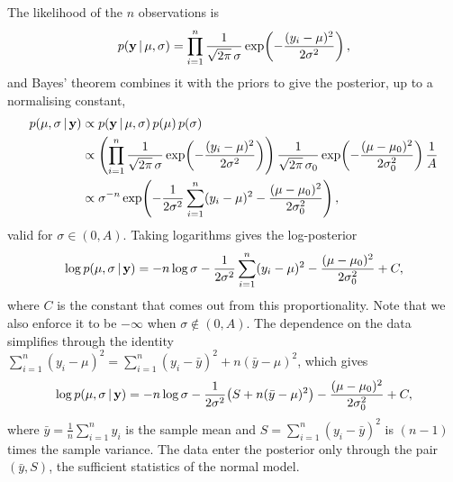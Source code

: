 The likelihood of the $n$ observations is
%
\begin{equation}
  p(\mathbf{y} \,|\, \mu, \sigma)
  = \prod_{i=1}^{n} \frac{1}{\sqrt{2\pi}\,\sigma}
    \exp\!\left(-\frac{(y_i - \mu)^2}{2\sigma^2}\right),
\end{equation}
%
and Bayes' theorem combines it with the priors to give the posterior,
up to a normalising constant,
%
\begin{equation}
\begin{aligned}
  p(\mu, \sigma \,|\, \mathbf{y})
  &\propto p(\mathbf{y} \,|\, \mu, \sigma)\,p(\mu)\,p(\sigma) \\
  &\propto \left(\prod_{i=1}^{n} \frac{1}{\sqrt{2\pi}\,\sigma}
     \exp\!\left(-\frac{(y_i-\mu)^2}{2\sigma^2}\right)\right)
     \frac{1}{\sqrt{2\pi}\,\sigma_0}
     \exp\!\left(-\frac{(\mu-\mu_0)^2}{2\sigma_0^2}\right)
     \frac{1}{A} \\
  &\propto \sigma^{-n}
     \exp\!\left(-\frac{1}{2\sigma^2}\sum_{i=1}^{n}(y_i-\mu)^2
     - \frac{(\mu-\mu_0)^2}{2\sigma_0^2}\right),
\end{aligned}
\end{equation}
%
valid for $\sigma \in (0, A)$. Taking logarithms gives the
log-posterior
%
\begin{equation}
  \log p(\mu, \sigma \,|\, \mathbf{y})
  = -n\log\sigma
    - \frac{1}{2\sigma^2}\sum_{i=1}^{n}(y_i - \mu)^2
    - \frac{(\mu - \mu_0)^2}{2\sigma_0^2}
    + C,
\end{equation}
%
where $C$ is the constant that comes out from this proportionality. Note that we also enforce it to be $-\infty$ when $\sigma \notin (0, A)$. The dependence on the
data simplifies through the identity
$\sum_{i=1}^{n}(y_i - \mu)^2 = \sum_{i=1}^{n}(y_i - \bar{y})^2
+ n(\bar{y} - \mu)^2$, which gives
%
\begin{equation}
  \log p(\mu, \sigma \,|\, \mathbf{y})
  = -n\log\sigma
    - \frac{1}{2\sigma^2}\big(S + n(\bar{y} - \mu)^2\big)
    - \frac{(\mu - \mu_0)^2}{2\sigma_0^2}
    + C,
  \label{eq:normal-logpost}
\end{equation}
%
where $\bar{y} = \tfrac{1}{n}\sum_{i=1}^{n} y_i$ is the sample mean
and $S = \sum_{i=1}^{n}(y_i - \bar{y})^2$ is $(n-1)$ times the sample
variance. The data enter the posterior only through the pair
$(\bar{y}, S)$, the sufficient statistics of the normal model.

